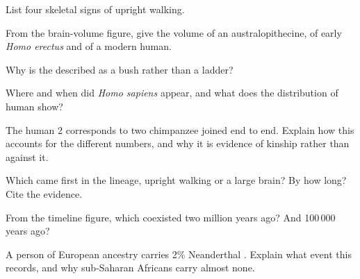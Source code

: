 \begin{exercise}[$\star$]\label{exo:g12:human-evolution:2}
List four skeletal signs of upright walking.
\end{exercise}

\begin{exercise}[$\star$]\label{exo:g12:human-evolution:3}
From the brain-volume figure, give the volume of an australopithecine,
of early \emph{Homo erectus} and of a modern human.
\end{exercise}

\begin{exercise}[$\star$]\label{exo:g12:human-evolution:4}
Why is the  described as a bush rather than a ladder?
\end{exercise}

\begin{exercise}[$\star$]\label{exo:g12:human-evolution:5}
Where and when did \emph{Homo sapiens} appear, and what does the
distribution of human  show?
\end{exercise}

\begin{exercise}[$\star\star$]\label{exo:g12:human-evolution:6}
The human  2 corresponds to two chimpanzee 
joined end to end. Explain how this accounts for the different
 numbers, and why it is evidence of kinship rather than
against it.
\end{exercise}

\begin{exercise}[$\star\star$]\label{exo:g12:human-evolution:7}
Which came first in the lineage, upright walking or a large brain? By
how long? Cite the evidence.
\end{exercise}

\begin{exercise}[$\star\star$]\label{exo:g12:human-evolution:8}
From the timeline figure, which  coexisted two million years
ago? And 100\,000 years ago?
\end{exercise}

\begin{exercise}[$\star\star$]\label{exo:g12:human-evolution:9}
A person of European ancestry carries 2\% Neanderthal . Explain
what event this records, and why sub-Saharan Africans carry almost
none.
\end{exercise}

